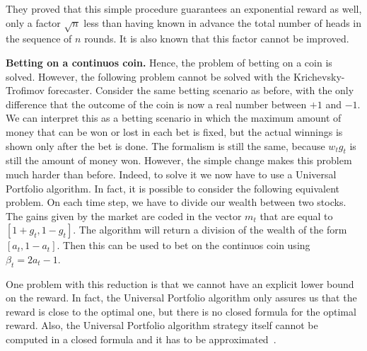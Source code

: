 They proved that this simple procedure guarantees an exponential reward as well, only a factor $\sqrt{n}$ less than having known in advance the total number of heads in the sequence of $n$ rounds. It is also known that this factor cannot be improved.

\textbf{Betting on a continuos coin.}
Hence, the problem of betting on a coin is solved. However, the following problem cannot be solved with the Krichevsky-Trofimov forecaster. Consider the same betting scenario as before, with the only difference that the outcome of the coin is now a real number between $+1$ and $-1$. We can interpret this as a betting scenario in which the maximum amount of money that can be won or lost in each bet is fixed, but the actual winnings is shown only after the bet is done. The formalism is still the same, because $w_t g_t$ is still the amount of money won. However, the simple change makes this problem much harder than before. Indeed, to solve it we now have to use a Universal Portfolio algorithm. In fact, it is possible to consider the following equivalent problem. On each time step, we have to divide our wealth between two stocks. The gains given by the market are coded in the vector $m_t$ that are equal to $[1+g_t, 1-g_t]$. The algorithm will return a division of the wealth of the form $[a_t, 1-a_t]$. Then this can be used to bet on the continuos coin using $\beta_t=2 a_t-1$.

One problem with this reduction is that we cannot have an explicit lower bound on the reward. In fact, the Universal Portfolio algorithm only assures us that the reward is close to the optimal one, but there is no closed formula for the optimal reward.
Also, the Universal Portfolio algorithm strategy itself cannot be computed in a closed formula and it has to be approximated~\cite{KalaiV03}.
